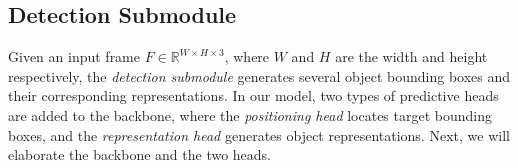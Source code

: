 \documentclass[acmsmall]{acmart}
\begin{document}
\subsection{Detection Submodule} \label{sec:detection_submodule}
{
Given an input frame $F \in \mathbb{R} ^ {W \times H \times 3}$, where $W$ and $H$ are the width and height respectively, the \emph{detection submodule} generates several} object bounding boxes and their corresponding representations. 
In {our model}, two types of predictive heads are added to the backbone, 
{where} the \emph{positioning head} locates target bounding boxes, 
{and} the \emph{representation head} generates object representations.
{
Next, we will elaborate the backbone and the two heads.
}


\end{document}
